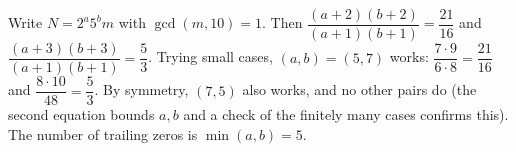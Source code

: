 Write $N=2^a5^bm$ with $\gcd(m,10)=1$. Then $\dfrac{(a+2)(b+2)}{(a+1)(b+1)}=\dfrac{21}{16}$ and $\dfrac{(a+3)(b+3)}{(a+1)(b+1)}=\dfrac53$. Trying small cases, $(a,b)=(5,7)$ works: $\dfrac{7\cdot9}{6\cdot8}=\dfrac{21}{16}$ and $\dfrac{8\cdot10}{48}=\dfrac53$. By symmetry, $(7,5)$ also works, and no other pairs do (the second equation bounds $a,b$ and a check of the finitely many cases confirms this). The number of trailing zeros is $\min(a,b)=\boxed{5}$.
